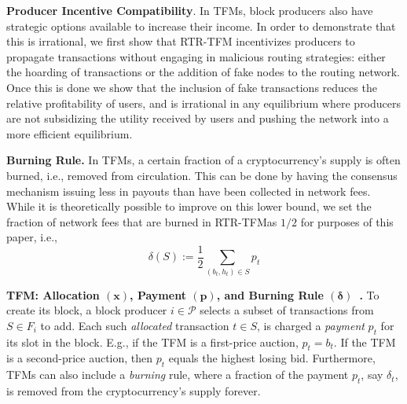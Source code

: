 \documentclass[sigconf,anonymous]{aamas}
\newcommand{\ourTFM}{\textsc{RTR-TFM}}
\renewcommand{\paragraph}[1]{\smallskip\noindent\textbf{#1}}
\begin{document}
\paragraph{Producer Incentive Compatibility}. In TFMs, block producers also have strategic options available to increase their income. In order to demonstrate that this is irrational, we first show that RTR-TFM incentivizes producers to propagate transactions without engaging in malicious routing strategies: either the hoarding of transactions or the addition of fake nodes to the routing network. Once this is done we show that the inclusion of fake transactions reduces the relative profitability of users, and is irrational in any equilibrium where producers are not subsidizing the utility received by users and pushing the network into a more efficient equilibrium.

















\paragraph{Burning Rule.} In TFMs, a certain fraction of a cryptocurrency's supply is often burned, i.e., removed from circulation. This can be done by having the consensus mechanism issuing less in payouts than have been collected in network fees. While it is theoretically possible to improve on this lower bound, we set the fraction of network fees that are burned in \ourTFM as $1/2$ for purposes of this paper, i.e.,
\begin{equation}\label{eqn::burn}
    \delta(S) := \frac{1}{2} \sum_{(b_t,h_t)\in S} p_t
\end{equation}






\paragraph{TFM: Allocation $(\mathbf{x})$, Payment $(\mathbf{p})$, and Burning Rule 
$(\mathbf{\delta})$~\cite{roughgarden2021,roughgarden2024transaction}.} To create its block, a block producer $i\in \mathcal{P}$ selects a subset of transactions from $S\in F_i$ to add. Each such \textit{allocated} transaction $t \in S$, is charged a \textit{payment} $p_t$ for its slot in the block. E.g., if the TFM is a first-price auction, $p_t = b_t$. If the TFM is a second-price auction, then $p_t$ equals the highest losing bid. Furthermore, TFMs can also include a \textit{burning} rule, where a fraction of the payment $p_t$, say $\delta_t$, is removed from the cryptocurrency's supply forever.
\end{document}

